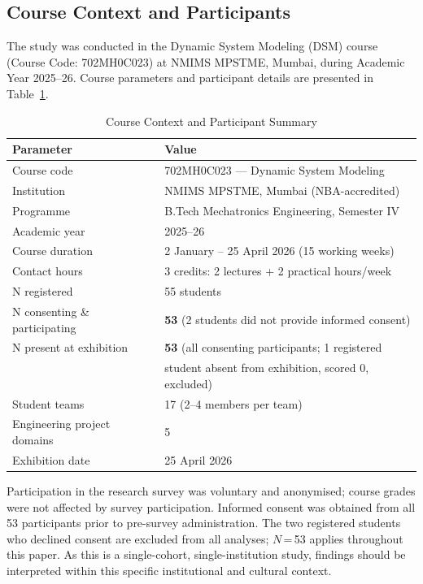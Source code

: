 \documentclass[utf8]{FrontiersinHarvard}
\begin{document}
\subsection{Course Context and Participants}

The study was conducted in the Dynamic System Modeling (DSM) course
(Course Code: 702MH0C023) at NMIMS MPSTME, Mumbai, during Academic Year
2025--26. Course parameters and participant details are presented in
Table~\ref{tab:context}.

\begin{table}[h]
\caption{Course Context and Participant Summary}
\label{tab:context}
\begin{tabular}{ll}
\toprule
\textbf{Parameter} & \textbf{Value} \\
\midrule
Course code                   & 702MH0C023 --- Dynamic System Modeling \\
Institution                   & NMIMS MPSTME, Mumbai (NBA-accredited) \\
Programme                     & B.Tech Mechatronics Engineering, Semester IV \\
Academic year                 & 2025--26 \\
Course duration               & 2 January -- 25 April 2026 (15 working weeks) \\
Contact hours                 & 3 credits: 2 lectures + 2 practical hours/week \\
N registered                  & 55 students \\
N consenting \& participating & \textbf{53} (2 students did not provide informed consent) \\
N present at exhibition       & \textbf{53} (all consenting participants; 1 registered \\
                              & \quad student absent from exhibition, scored 0, excluded) \\
Student teams                 & 17 (2--4 members per team) \\
Engineering project domains   & 5 \\
Exhibition date               & 25 April 2026 \\
\bottomrule
\end{tabular}
\end{table}

Participation in the research survey was voluntary and anonymised; course
grades were not affected by survey participation. Informed consent was
obtained from all 53 participants prior to pre-survey administration. The two
registered students who declined consent are excluded from all analyses;
$N$\,=\,53 applies throughout this paper. {\color{blue} As this is a single-cohort,
single-institution study, findings should be interpreted within this
specific institutional and cultural context.}
\end{document}
